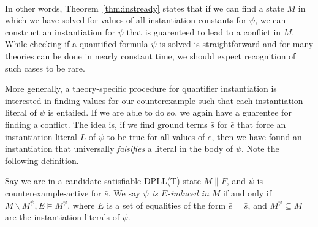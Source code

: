 \documentclass{llncs}
\newtheorem{cor}{Corollary}
\begin{document}
\ \\ 

\begin{comment}
\begin{cor}
\label{cor:instready}
Given a candidate-satisifiable DPLL(T) state $M \parallel F$, for all quantified formula $\psi \in M$,
if $\psi$ is counterexample-active in $M \parallel F$ and solved in $M$, then the instantiation clause $( \neg \psi$ $\vee$ $\varphi[rep_M( \bar{e} )/\bar{x}])$ has not been added to $F$.
\end{cor}
\begin{proof}
The proof is immediate, noting that by Theorem~\ref{thm:instready}, $( \neg \psi \vee \varphi[rep_M( \bar{e} )/\bar{x}])$ is $T$-unsatisifiable in $M$, and therefore cannot be satisfied in $M \parallel F$. $\Box$
\end{proof}
Corollary~\ref{cor:instready} states that if we can find such an instantiation, then it has not yet been applied.
This fact guarentees that no redundant instantiations are used in certain instantiation schemes.
\end{comment}

In other words, Theorem~\ref{thm:instready} states that if we can find a state $M$ in which we have solved for values of all instantiation constants for $\psi$, we can construct an instantiation for $\psi$ that is guarenteed to lead to a conflict in $M$.
While checking if a quantified formula $\psi$ is solved is straightforward and for many theories can be done in nearly constant time, we should expect recognition of such cases to be rare.

More generally, a theory-specific procedure for quantifier instantiation is interested in finding values for our counterexample such that each instantiation literal of $\psi$ is entailed.
If we are able to do so, we again have a guarentee for finding a conflict.
The idea is, if we find ground terms $\bar{s}$ for $\bar{e}$ that force an instantiation literal $L$ of $\psi$ to be true for all values of $\bar{e}$, then we have found an instantiation that universally \emph{falsifies} a literal in the body of $\psi$.
Note the following definition.

\begin{definition}[E-induced]
Say we are in a candidate satisfiable DPLL(T) state $M \parallel F$, and $\psi$ is counterexample-active for $\bar{e}$.
We say \emph{$\psi$ is $E$-induced in $M$} if and only if $M \backslash M^\psi, E \models M^\psi$, where $E$ is a set of equalities of the form $\bar{e} = \bar{s}$, and $M^\psi \subseteq M$ are the instantiation literals of $\psi$.
\end{definition}
\end{document}
